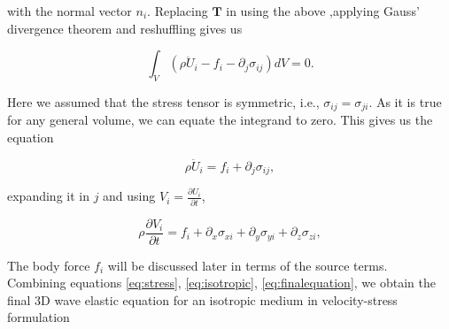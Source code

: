 with the normal vector $n_i$. Replacing $\mathbf{T}$ in  using the above
,applying Gauss' divergence theorem and reshuffling gives us

\begin{equation}
    \int_V \left(\rho \ddot{U}_i - f_i - \partial_j \sigma_{ij}\right)dV = 0.
\end{equation}

Here we assumed that the stress tensor is symmetric, i.e., $\sigma_{ij}=\sigma_{ji}$. As it is true for any general volume, we can
equate the integrand to zero. This gives us the equation

\begin{equation}
    \rho \ddot{U}_i = f_i + \partial_j \sigma_{ij},
    \label{eq:force}
\end{equation}

expanding it in $j$ and using $V_i = \frac{\partial U_i}{\partial t}$,

\begin{equation}
    \rho \frac{\partial V_i}{\partial t} = f_i + \partial_x \sigma_{xi} + \partial_y \sigma_{yi} + \partial_z \sigma_{zi},
    \label{eq:finalequation}
\end{equation}

The body force $f_i$ will be discussed later in terms of the source terms. \\

Combining equations \ref{eq:stress}, \ref{eq:isotropic}, \ref{eq:finalequation}, we obtain the final 3D 
wave elastic equation for an isotropic medium in velocity-stress formulation

